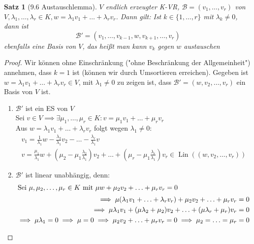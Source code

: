 \documentclass[a4paper]{scrartcl}
\DeclareMathOperator{\Exists}{\exists}
\DeclareMathOperator{\Lin}{Lin}
\theoremstyle{definition}
\theoremstyle{plain}
\newtheorem{thm}{Satz}
\theoremstyle{plain}
\theoremstyle{remark}
\theoremstyle{remark}
\theoremstyle{remark}
\theoremstyle{remark}
\theoremstyle{remark}
\begin{document}
\begin{thm}[9.6 Austauschlemma]
$V$ endlich erzeugter K-VR, $\mathcal{B} = (v_1, \ldots, v_r)$ von $V,\lambda_1, \ldots,\lambda_r \in K,w = \lambda_1 v_1 + \ldots + \lambda_r v_r$. Dann gilt:
Ist $k\in \{1,\ldots, r\}$ mit $\lambda_k \neq 0$, dann ist
\[\mathcal{B}' = (v_1, \ldots, v_{k - 1}, w, v_{k + 1}, \ldots, v_r)\]
ebenfalls eine Basis von $V$, das heißt man kann $v_k$ gegen $w$ austauschen
\end{thm}
\begin{proof}
Wir können ohne Einschränkung ("ohne Beschränkung der Allgemeinheit") annehmen, dass $k = 1$ ist (können wir durch Umsortieren erreichen). Gegeben ist $w = \lambda_1 v_1 + \ldots + \lambda_r v_r \in V$, mit $\lambda_1 \neq 0$
zu zeigen ist, dass $\mathcal{B}' = (w, v_2, \ldots, v_r)$ ein Basis von $V$ ist.
\begin{enumerate}
\item $\mathcal{B}'$ ist ein ES von $V$ \\
     Sei $v\in V \implies \Exists \mu_1, \ldots, \mu_r \in K: v = \mu_1 v_1 + \ldots + \mu_r v_r$ \\
     Aus $w = \lambda_1 v_1 + \ldots + \lambda_r v_r$ folgt wegen $\lambda_1 \neq 0$:
\begin{align*}
v_1 = \frac{1}{\lambda_1} w - \frac{\lambda_2}{\lambda_1} v_2 - \ldots - \frac{\lambda_r}{\lambda_1} v \\
v =\frac{\mu_1}{\lambda_1} w + (\mu_2 - \mu_1 \frac{\lambda_2}{\lambda_1}) v_2 + \ldots + (\mu_r - \mu_1 \frac{\lambda_r}{\lambda_1}) v_r \in \Lin ((w, v_2, \ldots, v_r))
\end{align*}
\item $\mathcal{B}'$ ist linear unabhängig, denn: \\
\begin{align*}
\intertext{Sei $\mu, \mu_2, \ldots, \mu_r \in K$ mit $\mu w + \mu_2 v_2 + \ldots + \mu_r v_r = 0$}
\implies \mu(\lambda_1 v_1 + \ldots + \lambda_r v_r) + \mu_2 v_2 + \ldots + \mu_r v_r = 0 \\
\implies \mu \lambda_1 v_1 + (\mu \lambda_2 + \mu_2) v_2 + \ldots + (\mu \lambda_r + \mu_r) v_r = 0 \\
\implies \mu \lambda_1 = 0 \implies \mu = 0 \implies \mu_2 v_2 + \ldots + \mu_r v_r = 0 \implies \mu_2 = \ldots = \mu_r = 0
\end{align*}
\end{enumerate}
\end{proof}
\end{document}
